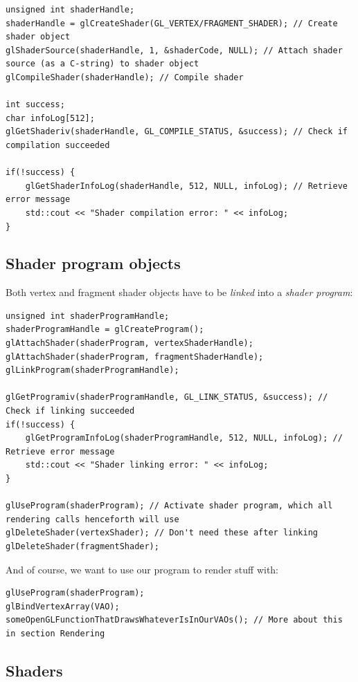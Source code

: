 \documentclass[table, xcdraw]{article}%
\begin{document}
\begin{verbatim}
unsigned int shaderHandle;
shaderHandle = glCreateShader(GL_VERTEX/FRAGMENT_SHADER); // Create shader object
glShaderSource(shaderHandle, 1, &shaderCode, NULL); // Attach shader source (as a C-string) to shader object
glCompileShader(shaderHandle); // Compile shader

int success;
char infoLog[512];
glGetShaderiv(shaderHandle, GL_COMPILE_STATUS, &success); // Check if compilation succeeded

if(!success) {
    glGetShaderInfoLog(shaderHandle, 512, NULL, infoLog); // Retrieve error message
    std::cout << "Shader compilation error: " << infoLog;
}
\end{verbatim}

\subsection{Shader program objects}

Both vertex and fragment shader objects have to be \emph{linked} into a \emph{shader program}:

\begin{verbatim}
unsigned int shaderProgramHandle;
shaderProgramHandle = glCreateProgram();
glAttachShader(shaderProgram, vertexShaderHandle);
glAttachShader(shaderProgram, fragmentShaderHandle);
glLinkProgram(shaderProgramHandle);

glGetProgramiv(shaderProgramHandle, GL_LINK_STATUS, &success); // Check if linking succeeded
if(!success) {
    glGetProgramInfoLog(shaderProgramHandle, 512, NULL, infoLog); // Retrieve error message
    std::cout << "Shader linking error: " << infoLog;
}

glUseProgram(shaderProgram); // Activate shader program, which all rendering calls henceforth will use
glDeleteShader(vertexShader); // Don't need these after linking
glDeleteShader(fragmentShader);
\end{verbatim}

And of course, we want to use our program to render stuff with:

\begin{verbatim}
glUseProgram(shaderProgram);
glBindVertexArray(VAO);
someOpenGLFunctionThatDrawsWhateverIsInOurVAOs(); // More about this in section Rendering
\end{verbatim}

\subsection{Shaders} \label{shaders}
\end{document}
